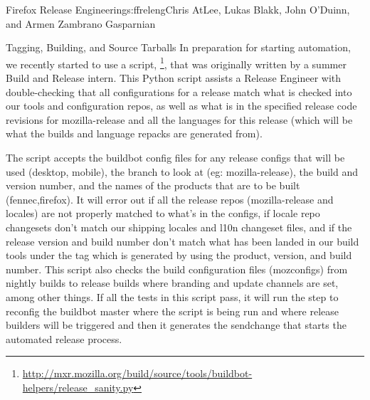 \begin{aosachapter}{Firefox Release Engineering}{s:ffreleng}{Chris AtLee, Lukas Blakk, John O'Duinn, and Armen Zambrano Gasparnian}
\begin{aosasect1}{Tagging, Building, and Source Tarballs}
In preparation for starting automation, we recently started to use a
script,
\footnote{\url{http://mxr.mozilla.org/build/source/tools/buildbot-helpers/release_sanity.py}}, 
that was originally written by a summer Build and Release intern. This
Python script assists a Release Engineer with double-checking that
all configurations for a release match what is checked into our tools
and configuration repos, as well as what is in the specified release
code revisions for mozilla-release and all the languages for this
release (which will be what the builds and language repacks are
generated from).

The script accepts the buildbot config files for any release configs
that will be used (desktop, mobile), the branch to look at (eg:
mozilla-release), the build and version number, and the names of the
products that are to be built (fennec,firefox). It will error out if
all the release repos (mozilla-release and locales) are not properly
matched to what's in the configs, if locale repo changesets don't
match our shipping locales and l10n changeset files, and if the
release version and build number don't match what has been landed in
our build tools under the tag which is generated by using the product,
version, and build number. This script also checks the build
configuration files (mozconfigs) from nightly builds to release builds
where branding and update channels are set, among other things. If all
the tests in this script pass, it will run the step to reconfig the
buildbot master where the script is being run and where release
builders will be triggered and then it generates the sendchange that
starts the automated release process.


\end{aosasect1}
\end{aosachapter}

